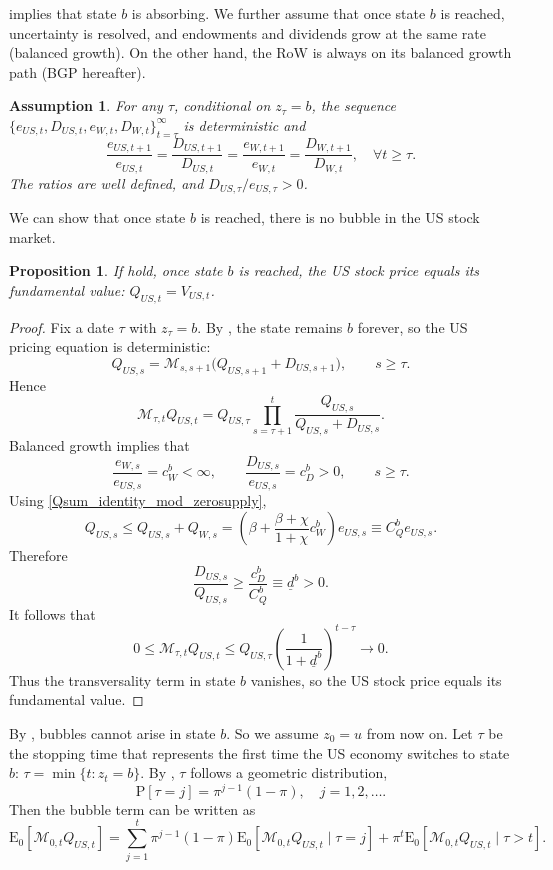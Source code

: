 \documentclass[12pt]{article}
\theoremstyle{plain}
\newtheorem{ass}{Assumption}
\newtheorem{prop}{Proposition}
\begin{document}
 implies that state $b$ is absorbing. We further assume that once state $b$ is reached, uncertainty is resolved,
and endowments and dividends grow at the same rate (balanced growth). On the other hand, the RoW is always on its balanced growth path (BGP hereafter).

\begin{ass}\label{ass_balanced_growth}
For any $\tau$, conditional on $z_\tau = b$, the sequence
$\{e_{US,t}, D_{US,t}, e_{W,t}, D_{W,t}\}_{t=\tau}^\infty$ is deterministic and
\[
\frac{e_{US,t+1}}{e_{US, t}} =
\frac{D_{US, t+1}}{D_{US,t}}=
\frac{e_{W,t+1}}{e_{W, t}} =
\frac{D_{W, t+1}}{D_{W,t}} ,\quad \forall t \geq \tau.
\]
The ratios are well defined, and \(D_{US,\tau}/e_{US,\tau}>0\).
\end{ass}

We can show that once state $b$ is reached, there is no bubble in the US stock market.

\begin{prop}\label{prop1}
If  hold, once state $b$ is reached, the US stock price equals its fundamental value:
$Q_{US,t}=V_{US,t}$.
\end{prop}

\begin{proof}
Fix a date $\tau$ with $z_\tau=b$. By , the state remains
$b$ forever, so the US pricing equation is deterministic:
\[
Q_{US,s}
=
\mathcal M_{s,s+1}\bigl(Q_{US,s+1}+D_{US,s+1}\bigr),
\qquad s\ge \tau.
\]
Hence
\[
\mathcal M_{\tau,t}Q_{US,t}
=
Q_{US,\tau}
\prod_{s=\tau+1}^{t}
\frac{Q_{US,s}}{Q_{US,s}+D_{US,s}}.
\]
Balanced growth implies that
\[
\frac{e_{W,s}}{e_{US,s}}=c_W^b<\infty,
\qquad
\frac{D_{US,s}}{e_{US,s}}=c_D^b>0,
\qquad s\ge \tau.
\]
Using \eqref{Qsum_identity_mod_zerosupply},
\[
Q_{US,s}
\le
Q_{US,s}+Q_{W,s}
=
\left(\beta+\frac{\beta+\chi}{1+\chi}c_W^b\right)e_{US,s}
\equiv C_Q^b e_{US,s}.
\]
Therefore
\[
\frac{D_{US,s}}{Q_{US,s}}
\ge
\frac{c_D^b}{C_Q^b}
\equiv \underline d^b>0.
\]
It follows that
\[
0\le
\mathcal M_{\tau,t}Q_{US,t}
\le
Q_{US,\tau}
\left(\frac{1}{1+\underline d^b}\right)^{t-\tau}
\to0.
\]
Thus the transversality term in state $b$ vanishes, so the US stock price
equals its fundamental value.
\end{proof}

By , bubbles cannot arise in state $b$. So we assume $z_0=u$ from now on. Let $\tau$ be the stopping time that represents the first time the US economy switches to state $b$:
$\tau =\min \{t:z_t=b\}$. By , $\tau$ follows a geometric distribution,
\[
\mathrm{P}[\tau=j]=\pi^{j-1}(1-\pi), \quad j=1,2,\dots.
\]
Then the bubble term can be written as
\[
\mathrm{E}_0\left[\mathcal{M}_{0 , t} Q_{US,t}\right]
=\sum_{j=1}^t \pi^{j-1}(1-\pi) \mathrm{E}_0\left[\mathcal{M}_{0,t} Q_{US,t} \mid \tau=j\right]
+\pi^t \mathrm{E}_0\left[\mathcal{M}_{0, t} Q_{US,t} \mid \tau>t\right].
\]
\end{document}
